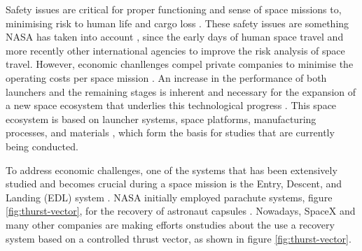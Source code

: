 Safety issues are critical for proper functioning and sense of space missions to, minimising risk to human life  and cargo loss \cite{quinn_acceptable_nodate}. These safety issues are something NASA has taken into account \cite{shin_nasa_2014}, since the early days of human space travel and more recently other international agencies to improve the risk analysis of space travel.  However, economic chanllenges compel private companies to minimise the operating costs per space mission \cite{gomes_road_2013}. An increase in the performance of both launchers and the remaining stages is inherent and necessary for the expansion of a new space ecosystem that underlies this technological progress \cite{garzaniti_review_2021}. This space ecosystem is  based on launcher systems, space platforms, manufacturing processes, and materials \cite{garzaniti_review_2021}, which form the basis for studies that are currently being conducted.

To address economic challenges, one of the systems that has been extensively studied and becomes crucial during a space mission is the Entry, Descent, and Landing (EDL) system \cite{diaz-silva_rotary_2013}. NASA initially employed parachute systems, figure \ref{fig:thurst-vector}, for the recovery of astronaut capsules \cite{ragab_launch_2015}. Nowadays,  SpaceX \cite{noauthor_spacex_nodate} and many other companies are making efforts onstudies about the use a recovery system based on a controlled thrust vector, as shown in figure \ref{fig:thurst-vector}.

